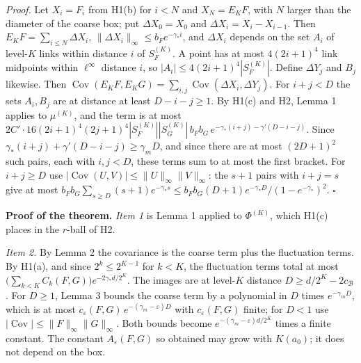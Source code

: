 \documentclass[11pt,a4paper]{article}
\begin{document}
\emph{Proof.} Let \(X_i=F_i\) from H1(b) for \(i<N\) and \(X_N=E_KF\),
with \(N\) larger than the diameter of the coarse box; put
\(\Delta X_0=X_0\) and \(\Delta X_i=X_i-X_{i-1}\). Then
\(E_KF=\sum_{i\le N}\Delta X_i\),
\(\|\Delta X_i\|_\infty\le b_Fe^{-\gamma_*i}\), and \(\Delta X_i\)
depends on the set \(A_i\) of level-\(K\) links within distance \(i\) of
\(S_F^{(K)}\). A point has at most \(4(2i+1)^4\) link midpoints within
\(\ell^\infty\) distance \(i\), so \(|A_i|\le4(2i+1)^4|S_F^{(K)}|\).
Define \(\Delta Y_j\) and \(B_j\) likewise. Then
\(\operatorname{Cov}(E_KF,E_KG)=\sum_{i,j}\operatorname{Cov}(\Delta X_i,\Delta Y_j)\).
For \(i+j<D\) the sets \(A_i,B_j\) are at distance at least
\(D-i-j\ge1\). By H1(c) and H2, Lemma 1 applies to \(\mu^{(K)}\), and
the term is at most
\(2C'\cdot16(2i+1)^4(2j+1)^4|S_F^{(K)}||S_G^{(K)}|\,b_Fb_G\,e^{-\gamma_*(i+j)-\gamma'(D-i-j)}\).
Since \(\gamma_*(i+j)+\gamma'(D-i-j)\ge\gamma_mD\), and since there are
at most \((2D+1)^2\) such pairs, each with \(i,j<D\), these terms sum to
at most the first bracket. For \(i+j\ge D\) use
\(|\operatorname{Cov}(U,V)|\le\|U\|_\infty\|V\|_\infty\): the \(s+1\)
pairs with \(i+j=s\) give at most
\(b_Fb_G\sum_{s\ge D}(s+1)e^{-\gamma_*s}\le b_Fb_G(D+1)e^{-\gamma_*D}/(1-e^{-\gamma_*})^2\).
\(\square\)

\textbf{Proof of the theorem.} \emph{Item 1} is Lemma 1 applied to
\(\Phi^{(K)}\), which H1(c) places in the \(r\)-ball of H2.

\emph{Item 2.} By Lemma 2 the covariance is the coarse term plus the
fluctuation terms. By H1(a), and since \(2^k\le2^{K-1}\) for \(k<K\),
the fluctuation terms total at most
\(\big(\sum_{k<K}C_k(F,G)\big)e^{-2\gamma_*d/2^K}\). The images are at
level-\(K\) distance \(D\ge d/2^K-2c_{\mathcal B}\). For \(D\ge1\),
Lemma 3 bounds the coarse term by a polynomial in \(D\) times
\(e^{-\gamma_mD}\), which is at most
\(c_\varepsilon(F,G)\,e^{-(\gamma_m-\varepsilon)D}\) with
\(c_\varepsilon(F,G)\) finite; for \(D<1\) use
\(|\operatorname{Cov}|\le\|F\|_\infty\|G\|_\infty\). Both bounds become
\(e^{-(\gamma_m-\varepsilon)d/2^K}\) times a finite constant. The
constant \(A_\varepsilon(F,G)\) so obtained may grow with \(K(a_0)\); it
does not depend on the box.
\end{document}
